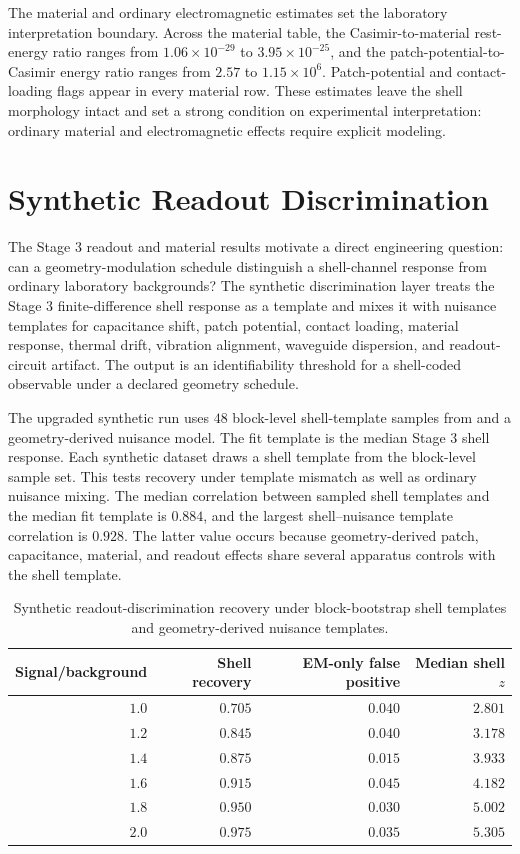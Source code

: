 \documentclass[11pt]{article}
\begin{document}
The material and ordinary electromagnetic estimates set the laboratory
interpretation boundary. Across the material table, the Casimir-to-material
rest-energy ratio ranges from $1.06\times10^{-29}$ to $3.95\times10^{-25}$,
and the patch-potential-to-Casimir energy ratio ranges from $2.57$ to
$1.15\times10^{6}$. Patch-potential and contact-loading flags appear in every
material row. These estimates leave the shell morphology intact and set a
strong condition on experimental interpretation: ordinary material and
electromagnetic effects require explicit modeling.

\section{Synthetic Readout Discrimination}

The Stage 3 readout and material results motivate a direct engineering
question: can a geometry-modulation schedule distinguish a shell-channel
response from ordinary laboratory backgrounds? The synthetic discrimination
layer treats the Stage 3 finite-difference shell response as a template and
mixes it with nuisance templates for capacitance shift, patch potential,
contact loading, material response, thermal drift, vibration alignment,
waveguide dispersion, and readout-circuit artifact. The output is an
identifiability threshold for a shell-coded observable under a declared
geometry schedule.

The upgraded synthetic run uses $48$ block-level shell-template samples from
 and a geometry-derived nuisance
model. The fit template is the median Stage 3 shell response. Each synthetic
dataset draws a shell template from the block-level sample set. This tests
recovery under template mismatch as well as ordinary nuisance mixing. The
median correlation between sampled shell templates and the median fit template
is $0.884$, and the largest shell--nuisance template correlation is $0.928$.
The latter value occurs because geometry-derived patch, capacitance, material,
and readout effects share several apparatus controls with the shell template.

\begin{table}[htbp]
\centering
\caption{Synthetic readout-discrimination recovery under block-bootstrap shell templates and geometry-derived nuisance templates.}
\label{tab:synthetic_discrimination}
\small
\begin{tabular}{rrrr}
\toprule
Signal/background & Shell recovery & EM-only false positive & Median shell $z$ \\
\midrule
$1.0$ & $0.705$ & $0.040$ & $2.801$ \\
$1.2$ & $0.845$ & $0.040$ & $3.178$ \\
$1.4$ & $0.875$ & $0.015$ & $3.933$ \\
$1.6$ & $0.915$ & $0.045$ & $4.182$ \\
$1.8$ & $0.950$ & $0.030$ & $5.002$ \\
$2.0$ & $0.975$ & $0.035$ & $5.305$ \\
\bottomrule
\end{tabular}
\end{table}
\end{document}
